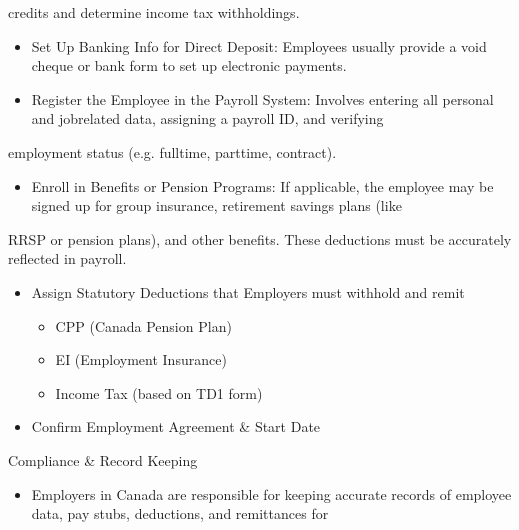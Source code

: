 \documentclass[letterpaper,10pt,english]{sphinxmanual}
\begin{document}
\sphinxAtStartPar
credits and determine income tax withholdings.
\begin{itemize}
\item {} 
\sphinxAtStartPar
Set Up Banking Info for Direct Deposit: Employees usually provide a void cheque or bank form to set up electronic payments.

\item {} 
\sphinxAtStartPar
Register the Employee in the Payroll System: Involves entering all personal and job\sphinxhyphen{}related data, assigning a payroll ID, and verifying

\end{itemize}

\sphinxAtStartPar
employment status (e.g. full\sphinxhyphen{}time, part\sphinxhyphen{}time, contract).
\begin{itemize}
\item {} 
\sphinxAtStartPar
Enroll in Benefits or Pension Programs: If applicable, the employee may be signed up for group insurance, retirement savings plans (like

\end{itemize}

\sphinxAtStartPar
RRSP or pension plans), and other benefits. These deductions must be accurately reflected in payroll.
\begin{itemize}
\item {} 
\sphinxAtStartPar
Assign Statutory Deductions that Employers must withhold and remit
\begin{itemize}
\item {} 
\sphinxAtStartPar
CPP (Canada Pension Plan)

\item {} 
\sphinxAtStartPar
EI (Employment Insurance)

\item {} 
\sphinxAtStartPar
Income Tax (based on TD1 form)

\end{itemize}

\item {} 
\sphinxAtStartPar
Confirm Employment Agreement \& Start Date

\end{itemize}

\sphinxAtStartPar
Compliance \& Record Keeping
\begin{itemize}
\item {} 
\sphinxAtStartPar
Employers in Canada are responsible for keeping accurate records of employee data, pay stubs, deductions, and remittances for

\end{itemize}
\end{document}
